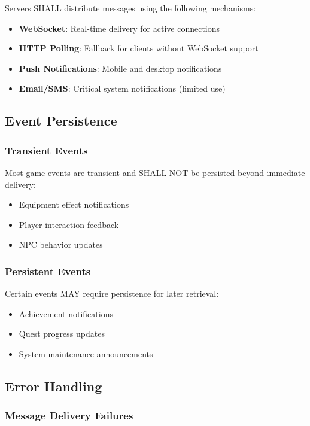 \documentclass[12pt,a4paper]{article}
\begin{document}
Servers SHALL distribute messages using the following mechanisms:

\begin{itemize}
\item \textbf{WebSocket}: Real-time delivery for active connections
\item \textbf{HTTP Polling}: Fallback for clients without WebSocket support
\item \textbf{Push Notifications}: Mobile and desktop notifications
\item \textbf{Email/SMS}: Critical system notifications (limited use)
\end{itemize}

\subsection{Event Persistence}

\subsubsection{Transient Events}

Most game events are transient and SHALL NOT be persisted beyond immediate delivery:

\begin{itemize}
\item Equipment effect notifications
\item Player interaction feedback
\item NPC behavior updates
\end{itemize}

\subsubsection{Persistent Events}

Certain events MAY require persistence for later retrieval:

\begin{itemize}
\item Achievement notifications
\item Quest progress updates
\item System maintenance announcements
\end{itemize}

\subsection{Error Handling}

\subsubsection{Message Delivery Failures}
\end{document}

